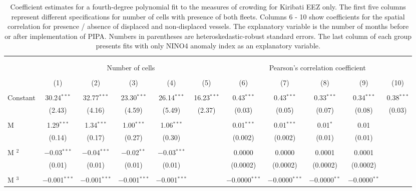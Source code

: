 \documentclass[12pt]{article}
\begin{document}
\begin{landscape}
\begin{table}[H] \centering 
  \caption{\label{tab:KIR_sp_corr}Coefficient estimates for a fourth-degree polynomial fit to the measures of crowding for Kiribati EEZ only. The first five columns represent different specifications for number of cells with presence of both fleets. Columns 6 - 10 show coefficients for the spatial correlation for presence / absence of displaced and non-displaced vessels. The explanatory variable is the number of months before or after implementation of PIPA. Numbers in parentheses are heteroskedastic-robust standard errors. The last column of each group presents fits with only NINO4 anomaly index as an explanatory variable.} 
  \label{} 
\footnotesize 
\begin{tabular}{@{\extracolsep{0.1pt}}lcccccccccc} 
\\[-1.8ex]\hline 
\hline \\[-1.8ex] 
\\[-1.8ex] & \multicolumn{5}{c}{Number of cells} & \multicolumn{5}{c}{Pearson's correlation coefficient} \\ 
\\[-1.8ex] & (1) & (2) & (3) & (4) & (5) & (6) & (7) & (8) & (9) & (10)\\ 
\hline \\[-1.8ex] 
 Constant & 30.24$^{***}$ & 32.77$^{***}$ & 23.30$^{***}$ & 26.14$^{***}$ & 16.23$^{***}$ & 0.43$^{***}$ & 0.43$^{***}$ & 0.33$^{***}$ & 0.34$^{***}$ & 0.38$^{***}$ \\ 
  & (2.43) & (4.16) & (4.59) & (5.49) & (2.37) & (0.03) & (0.05) & (0.07) & (0.08) & (0.03) \\ 
  & & & & & & & & & & \\ 
 M & 1.29$^{***}$ & 1.34$^{***}$ & 1.00$^{***}$ & 1.06$^{***}$ &  & 0.01$^{***}$ & 0.01$^{***}$ & 0.01$^{*}$ & 0.01 &  \\ 
  & (0.14) & (0.17) & (0.27) & (0.30) &  & (0.002) & (0.002) & (0.01) & (0.01) &  \\ 
  & & & & & & & & & & \\ 
 M $^2$ & $-$0.03$^{***}$ & $-$0.04$^{***}$ & $-$0.02$^{**}$ & $-$0.03$^{***}$ &  & 0.0000 & 0.0000 & 0.0001 & 0.0001 &  \\ 
  & (0.01) & (0.01) & (0.01) & (0.01) &  & (0.0002) & (0.0002) & (0.0002) & (0.0002) &  \\ 
  & & & & & & & & & & \\ 
 M $^3$ & $-$0.001$^{***}$ & $-$0.001$^{***}$ & $-$0.001$^{***}$ & $-$0.001$^{***}$ &  & $-$0.0000$^{***}$ & $-$0.0000$^{***}$ & $-$0.0000$^{**}$ & $-$0.0000$^{**}$ &  \\ 

\end{tabular}
\end{table}
\end{landscape}
\end{document}
